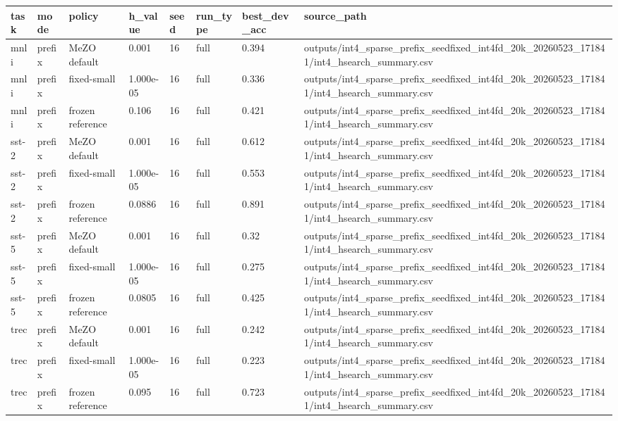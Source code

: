 \begin{table}[t]
\centering
\small
\begin{tabular}{llllllll}
\toprule
task & mode & policy & h\_value & seed & run\_type & best\_dev\_acc & source\_path \\
\midrule
mnli & prefix & MeZO default & 0.001 & 16 & full & 0.394 & outputs/int4\_sparse\_prefix\_seedfixed\_int4fd\_20k\_20260523\_171841/int4\_hsearch\_summary.csv \\
mnli & prefix & fixed-small & 1.000e-05 & 16 & full & 0.336 & outputs/int4\_sparse\_prefix\_seedfixed\_int4fd\_20k\_20260523\_171841/int4\_hsearch\_summary.csv \\
mnli & prefix & frozen reference & 0.106 & 16 & full & 0.421 & outputs/int4\_sparse\_prefix\_seedfixed\_int4fd\_20k\_20260523\_171841/int4\_hsearch\_summary.csv \\
sst-2 & prefix & MeZO default & 0.001 & 16 & full & 0.612 & outputs/int4\_sparse\_prefix\_seedfixed\_int4fd\_20k\_20260523\_171841/int4\_hsearch\_summary.csv \\
sst-2 & prefix & fixed-small & 1.000e-05 & 16 & full & 0.553 & outputs/int4\_sparse\_prefix\_seedfixed\_int4fd\_20k\_20260523\_171841/int4\_hsearch\_summary.csv \\
sst-2 & prefix & frozen reference & 0.0886 & 16 & full & 0.891 & outputs/int4\_sparse\_prefix\_seedfixed\_int4fd\_20k\_20260523\_171841/int4\_hsearch\_summary.csv \\
sst-5 & prefix & MeZO default & 0.001 & 16 & full & 0.32 & outputs/int4\_sparse\_prefix\_seedfixed\_int4fd\_20k\_20260523\_171841/int4\_hsearch\_summary.csv \\
sst-5 & prefix & fixed-small & 1.000e-05 & 16 & full & 0.275 & outputs/int4\_sparse\_prefix\_seedfixed\_int4fd\_20k\_20260523\_171841/int4\_hsearch\_summary.csv \\
sst-5 & prefix & frozen reference & 0.0805 & 16 & full & 0.425 & outputs/int4\_sparse\_prefix\_seedfixed\_int4fd\_20k\_20260523\_171841/int4\_hsearch\_summary.csv \\
trec & prefix & MeZO default & 0.001 & 16 & full & 0.242 & outputs/int4\_sparse\_prefix\_seedfixed\_int4fd\_20k\_20260523\_171841/int4\_hsearch\_summary.csv \\
trec & prefix & fixed-small & 1.000e-05 & 16 & full & 0.223 & outputs/int4\_sparse\_prefix\_seedfixed\_int4fd\_20k\_20260523\_171841/int4\_hsearch\_summary.csv \\
trec & prefix & frozen reference & 0.095 & 16 & full & 0.723 & outputs/int4\_sparse\_prefix\_seedfixed\_int4fd\_20k\_20260523\_171841/int4\_hsearch\_summary.csv \\

\end{tabular}
\end{table}
